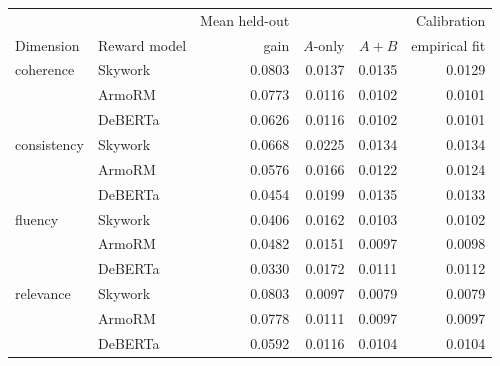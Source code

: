 \begin{tabular}{llrrrr}
\toprule
 &  & Mean held-out &  &  & Calibration \\
Dimension & Reward model & gain & $A$-only & $A{+}B$ & empirical fit \\
\midrule
coherence & Skywork & 0.0803 & 0.0137 & 0.0135 & 0.0129 \\
 & ArmoRM & 0.0773 & 0.0116 & 0.0102 & 0.0101 \\
 & DeBERTa & 0.0626 & 0.0116 & 0.0102 & 0.0101 \\
\midrule
consistency & Skywork & 0.0668 & 0.0225 & 0.0134 & 0.0134 \\
 & ArmoRM & 0.0576 & 0.0166 & 0.0122 & 0.0124 \\
 & DeBERTa & 0.0454 & 0.0199 & 0.0135 & 0.0133 \\
\midrule
fluency & Skywork & 0.0406 & 0.0162 & 0.0103 & 0.0102 \\
 & ArmoRM & 0.0482 & 0.0151 & 0.0097 & 0.0098 \\
 & DeBERTa & 0.0330 & 0.0172 & 0.0111 & 0.0112 \\
\midrule
relevance & Skywork & 0.0803 & 0.0097 & 0.0079 & 0.0079 \\
 & ArmoRM & 0.0778 & 0.0111 & 0.0097 & 0.0097 \\
 & DeBERTa & 0.0592 & 0.0116 & 0.0104 & 0.0104 \\
\bottomrule
\end{tabular}
